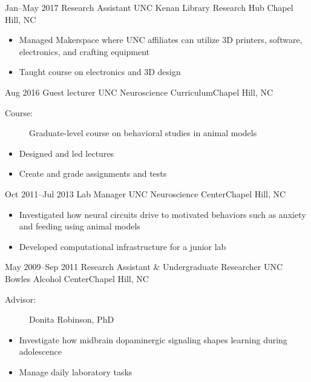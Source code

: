 \documentclass[11pt,a4paper,sans]{moderncv} %
\begin{document}
        \cventry
            {Jan--May 2017}
            {Research Assistant}
            {UNC Kenan Library Research Hub}
            {Chapel Hill, NC}{}
            {
                \begin{itemize}
                    \item Managed Makerspace where UNC affiliates can utilize 3D printers, software, electronics, and crafting equipment
                    \item Taught course on electronics and 3D design
                \end{itemize}
            }
        \cventry
            {Aug 2016}
            {Guest lecturer}
            {UNC Neuroscience Curriculum}{Chapel Hill, NC}{}
            {
                \begin{description}
                    \item[Course:] Graduate-level course on behavioral studies in animal models
                \end{description}
                \begin{itemize}
                    \item Designed and led lectures
                    \item Create and grade assignments and tests
                \end{itemize}
            }
        \cventry
            {Oct 2011--Jul 2013}
            {Lab Manager}
            {UNC Neuroscience Center}{Chapel Hill, NC}{}
            {
                \begin{itemize}
                    \item Investigated how neural circuits drive to motivated behaviors such as anxiety and feeding using animal models
                    \item Developed computational infrastructure for a junior lab
                \end{itemize}
            }
        \cventry
            {May 2009--Sep 2011}
            {Research Assistant \& Undergraduate Researcher}
            {UNC Bowles Alcohol Center}{Chapel Hill, NC}{}
            {
                \begin{description}
                    \item[Advisor:] Donita Robinson, PhD
                \end{description}
                \begin{itemize}
                    \item Investigate how midbrain dopaminergic signaling shapes learning during adolescence
                    \item Manage daily laboratory tasks
                \end{itemize}
            }
\end{document}
